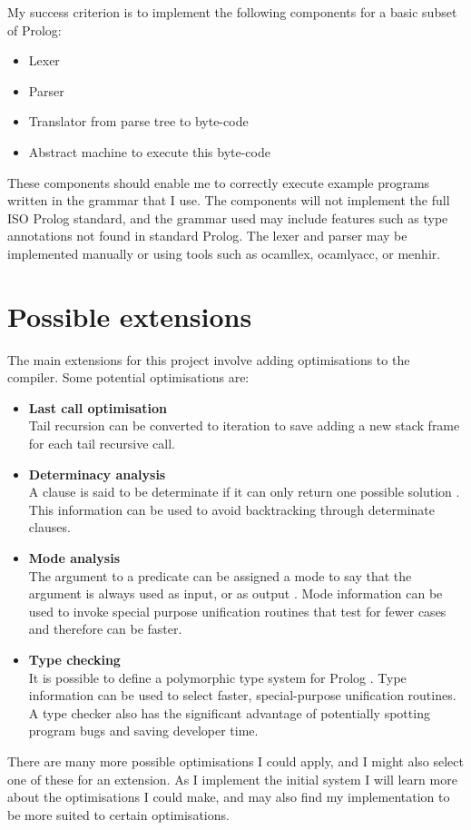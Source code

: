 \documentclass[12pt, a4paper]{article}
\begin{document}
My success criterion is to implement the following components for a basic subset of Prolog:
\begin{itemize}
\item Lexer
\item Parser
\item Translator from parse tree to byte-code
\item Abstract machine to execute this byte-code
\end{itemize}

These components should enable me to correctly execute example programs written in the grammar that I use. The components will not implement the full ISO Prolog standard, and the grammar used may include features such as type annotations not found in standard Prolog. The lexer and parser may be implemented manually or using tools such as ocamllex, ocamlyacc, or menhir.

\section*{Possible extensions}

The main extensions for this project involve adding optimisations to the compiler. Some potential optimisations are:
\begin{itemize}
\item \textbf{Last call optimisation} \\
Tail recursion can be converted to iteration to save adding a new stack frame for each tail recursive call.

\item \textbf{Determinacy analysis} \\
A clause is said to be determinate if it can only return one possible solution \cite{costsBenefitsAbstract}. This information can be used to avoid backtracking through determinate clauses.

\item \textbf{Mode analysis} \\
The argument to a predicate can be assigned a mode to say that the argument is always used as input, or as output \cite{autoMode}. Mode information can be used to invoke special purpose unification routines that test for fewer cases and therefore can be faster.


\item \textbf{Type checking} \\
It is possible to define a polymorphic type system for Prolog \cite{mycroftTypes}. Type information can be used to select faster, special-purpose unification routines. A type checker also has the significant advantage of potentially spotting program bugs and saving developer time.

\end{itemize}
There are many more possible optimisations I could apply, and I might also select one of these for an extension. As I implement the initial system I will learn more about the optimisations I could make, and may also find my implementation to be more suited to certain optimisations.
\end{document}

